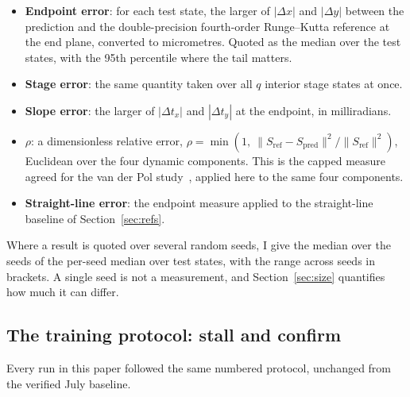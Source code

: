 \documentclass[11pt,a4paper]{article}
\begin{document}
\begin{itemize}
  \item \textbf{Endpoint error}: for each test state, the larger of
  $|\Delta x|$ and $|\Delta y|$ between the prediction and the double-precision
  fourth-order Runge--Kutta reference at the end plane, converted to
  micrometres. Quoted as the median over the test states, with the 95th
  percentile where the tail matters.
  \item \textbf{Stage error}: the same quantity taken over all $q$ interior
  stage states at once.
  \item \textbf{Slope error}: the larger of $|\Delta t_x|$ and $|\Delta t_y|$
  at the endpoint, in milliradians.
  \item \textbf{$\rho$}: a dimensionless relative error,
  $\rho = \min\!\left(1,\ \|S_{\mathrm{ref}} - S_{\mathrm{pred}}\|^2 /
  \|S_{\mathrm{ref}}\|^2\right)$, Euclidean over the four dynamic components.
  This is the capped measure agreed for the van der Pol
  study~\cite{scriven2026vdp}, applied here to the same four components.
  \item \textbf{Straight-line error}: the endpoint measure applied to the
  straight-line baseline of Section~\ref{sec:refs}.
\end{itemize}

Where a result is quoted over several random seeds, I give the median over the
seeds of the per-seed median over test states, with the range across seeds in
brackets. A single seed is not a measurement, and Section~\ref{sec:size}
quantifies how much it can differ.

\subsection{The training protocol: stall and confirm}
\label{sec:protocol}

Every run in this paper followed the same numbered protocol, unchanged from the
verified July baseline.
\end{document}
